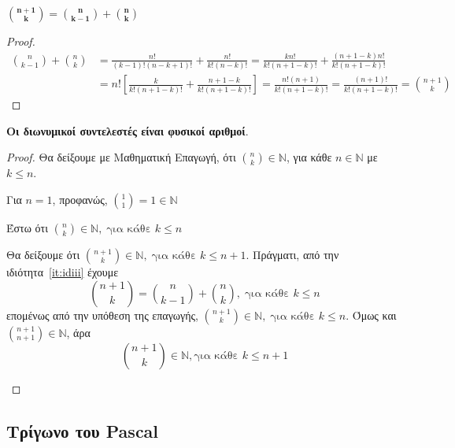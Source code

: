 \documentclass[a4paper,table]{report}
\begin{document}
\begin{enumerate}
  \item \label{it:idiii} 
    $ \bm{\binom{n+1}{k} = \binom{n}{k-1} + \binom{n}{k}} $
    \begin{proof}
      \begin{align*}
        \binom{n}{k-1} + \binom{n}{k} 
        &= \frac{n!}{(k-1)!(n-k+1)!} + \frac{n!}{k!(n-k)!} 
        = \frac{kn!}{k!(n+1-k)!} + \frac{(n+1-k)n!}{k!(n+1-k)!} \\
        &= n! \left[\frac{k}{k!(n+1-k)!} + \frac{n+1-k}{k!(n+1-k)!}\right] 
        = \frac{n!(n+1)}{k!(n+1-k)!} = \frac{(n+1)!}{k!(n+1-k)!} = 
        \binom{n+1}{k}
      \end{align*} 
    \end{proof}

  \item \textbf{Οι διωνυμικοί συντελεστές είναι φυσικοί αριθμοί}.
    \begin{proof}
    \item {}
      Θα δείξουμε με Μαθηματική Επαγωγή, ότι $ \binom{n}{k} \in \mathbb{N} $,
      για κάθε $ n \in \mathbb{N} $ με $ k \leq n $.
      \begin{myitemize}
        \item Για $ n=1 $, προφανώς, $ \binom{1}{1} = 1 \in \mathbb{N} $
        \item Έστω ότι $ \binom{n}{k} \in \mathbb{N}, \; \text{για κάθε } k \leq n $
        \item Θα δείξουμε ότι $ \binom{n+1}{k} \in \mathbb{N}, \; \text{για κάθε } 
          k \leq n+1$. Πράγματι, από την ιδιότητα~\ref{it:idiii} έχουμε
          \[
            \binom{n+1}{k} = \binom{n}{k-1} + \binom{n}{k}, \; \text{για κάθε } 
            k \leq n
          \]
          επομένως από την υπόθεση της επαγωγής, $ \textstyle{\binom{n+1}{k}} \in
          \mathbb{N}, \; \text{για κάθε } k \leq n $. Όμως και 
          $ \textstyle{\binom{n+1}{n+1} \in \mathbb{N}} $, άρα 
          \[
            \binom{n+1}{k} \in \mathbb{N}, \text{για κάθε } k \leq n+1 
          \] 
      \end{myitemize}
    \end{proof}
\end{enumerate}

\enlargethispage{2\baselineskip}

\subsection*{Τρίγωνο του Pascal}
\end{document}
